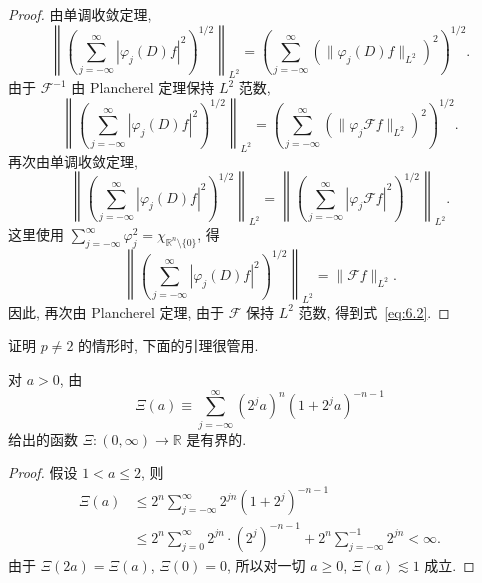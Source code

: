 \begin{proof}
由单调收敛定理,
\[
\left\|\left(\sum_{j=-\infty}^{\infty}|\varphi_{j}(D)f|^{2}\right)^{1/2}\right\|_{L^{2}} = \left(\sum_{j=-\infty}^{\infty}(\|\varphi_{j}(D)f\|_{L^{2}})^{2}\right)^{1/2}.
\]
由于 $\mathcal{F}^{-1}$ 由 Plancherel 定理保持 $L^{2}$ 范数,
\[
\left\|\left(\sum_{j=-\infty}^{\infty}|\varphi_{j}(D)f|^{2}\right)^{1/2}\right\|_{L^{2}} = \left(\sum_{j=-\infty}^{\infty}(\|\varphi_{j}\mathcal{F}f\|_{L^{2}})^{2}\right)^{1/2}.
\]
再次由单调收敛定理,
\[
\left\|\left(\sum_{j=-\infty}^{\infty}|\varphi_{j}(D)f|^{2}\right)^{1/2}\right\|_{L^{2}} = \left\|\left(\sum_{j=-\infty}^{\infty}|\varphi_{j}\mathcal{F}f|^{2}\right)^{1/2}\right\|_{L^{2}}.
\]
这里使用 $\sum_{j=-\infty}^{\infty}\varphi_{j}^{2} = \chi_{\mathbb{R}^{n}\setminus\{0\}}$, 得
\[
\left\|\left(\sum_{j=-\infty}^{\infty}|\varphi_{j}(D)f|^{2}\right)^{1/2}\right\|_{L^{2}} = \|\mathcal{F}f\|_{L^{2}}.
\]
因此, 再次由 Plancherel 定理, 由于 $\mathcal{F}$ 保持 $L^{2}$ 范数, 得到式~\eqref{eq:6.2}.
\end{proof}

证明 $p \neq 2$ 的情形时, 下面的引理很管用.

\begin{lemma}\label{lem:6.2}
对 $a > 0$, 由
\[
\Xi(a) \equiv \sum_{j=-\infty}^{\infty}(2^{j}a)^{n}(1 + 2^{j}a)^{-n-1}
\]
给出的函数 $\Xi: (0,\infty) \to \mathbb{R}$ 是有界的.
\end{lemma}

\begin{proof}
假设 $1 < a \leq 2$, 则
\begin{align*}
\Xi(a) &\leq 2^{n}\sum_{j=-\infty}^{\infty}2^{jn}(1 + 2^{j})^{-n-1} \\
&\leq 2^{n}\sum_{j=0}^{\infty}2^{jn}\cdot(2^{j})^{-n-1} + 2^{n}\sum_{j=-\infty}^{-1}2^{jn} < \infty.
\end{align*}
由于 $\Xi(2a) = \Xi(a)$, $\Xi(0) = 0$, 所以对一切 $a \geq 0$, $\Xi(a) \lesssim 1$ 成立.
\end{proof}

